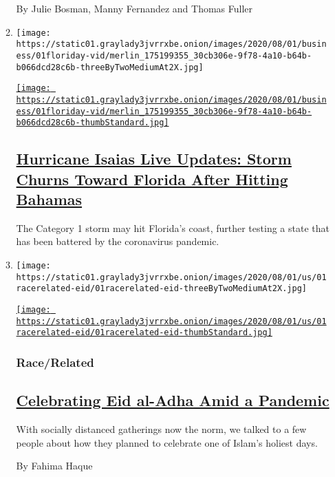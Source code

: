\begin{enumerate}
\begin{enumerate}
    By Julie Bosman, Manny Fernandez and Thomas Fuller
  \item
    \texttt{[image: https://static01.graylady3jvrrxbe.onion/images/2020/08/01/business/01floriday-vid/merlin\_175199355\_30cb306e-9f78-4a10-b64b-b066dcd28c6b-threeByTwoMediumAt2X.jpg]}

    \href{/2020/08/01/us/hurricane-isaias-track.html}{\texttt{[image: https://static01.graylady3jvrrxbe.onion/images/2020/08/01/business/01floriday-vid/merlin\_175199355\_30cb306e-9f78-4a10-b64b-b066dcd28c6b-thumbStandard.jpg]}}

    \hypertarget{hurricane-isaias-live-updates-storm-churns-toward-florida-after-hitting-bahamas}{%
    \subsection{\texorpdfstring{\href{/2020/08/01/us/hurricane-isaias-track.html}{Hurricane
    Isaias Live Updates: Storm Churns Toward Florida After Hitting
    Bahamas}}{Hurricane Isaias Live Updates: Storm Churns Toward Florida After Hitting Bahamas}}\label{hurricane-isaias-live-updates-storm-churns-toward-florida-after-hitting-bahamas}}

    The Category 1 storm may hit Florida's coast, further testing a
    state that has been battered by the coronavirus pandemic.
  \item
    \texttt{[image: https://static01.graylady3jvrrxbe.onion/images/2020/08/01/us/01racerelated-eid/01racerelated-eid-threeByTwoMediumAt2X.jpg]}

    \href{/2020/08/01/us/eid-al-adha-coronavirus.html}{\texttt{[image: https://static01.graylady3jvrrxbe.onion/images/2020/08/01/us/01racerelated-eid/01racerelated-eid-thumbStandard.jpg]}}

    \hypertarget{racerelated}{%
    \subsubsection{Race/Related}\label{racerelated}}

    \hypertarget{celebrating-eid-al-adha-amid-a-pandemic}{%
    \subsection{\texorpdfstring{\href{/2020/08/01/us/eid-al-adha-coronavirus.html}{Celebrating
    Eid al-Adha Amid a
    Pandemic}}{Celebrating Eid al-Adha Amid a Pandemic}}\label{celebrating-eid-al-adha-amid-a-pandemic}}

    With socially distanced gatherings now the norm, we talked to a few
    people about how they planned to celebrate one of Islam's holiest
    days.

    By Fahima Haque
  \end{enumerate}
\end{enumerate}

